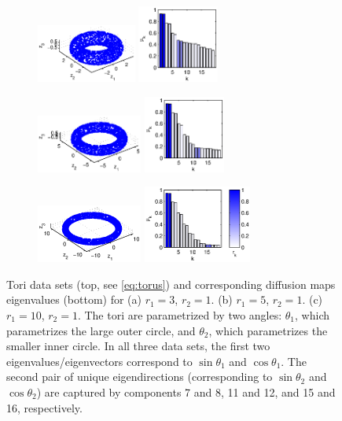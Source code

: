 \documentclass[3p]{elsarticle}
\begin{document}
\begin{figure}[t]
\centering
\begin{subfigure}{1.5in}
\centering
\includegraphics[height=0.75in]{torus1}
\includegraphics[height=1in]{torus1_evals}
\caption{}
\end{subfigure}
%
%
\begin{subfigure}{1.5in}
\centering
\includegraphics[height=0.75in]{torus2}
\includegraphics[height=1in]{torus2_evals}
\caption{}
\end{subfigure}
%
%
\begin{subfigure}{1.5in}
\centering
\includegraphics[height=0.75in]{torus3}
\includegraphics[height=1in]{torus3_evals}
\caption{}
\end{subfigure}
%
\hfill
%
\caption{Tori data sets (top, see \eqref{eq:torus}) and corresponding diffusion maps eigenvalues (bottom) for (a) $r_1 = 3$, $r_2 = 1$. (b) $r_1 = 5$, $r_2 = 1$. (c) $r_1 = 10$, $r_2 = 1$. The tori are parametrized by two angles: $\theta_1$, which parametrizes the large outer circle, and $\theta_2$, which parametrizes the smaller inner circle. In all three data sets, the first two eigenvalues/eigenvectors correspond to $\sin \theta_1$ and $\cos \theta_1$. The second pair of unique eigendirections (corresponding to $\sin \theta_2$ and $\cos \theta_2$) are captured by components 7 and 8, 11 and 12, and 15 and 16, respectively.}
%
\label{fig:torus}
%
\end{figure}
\end{document}
